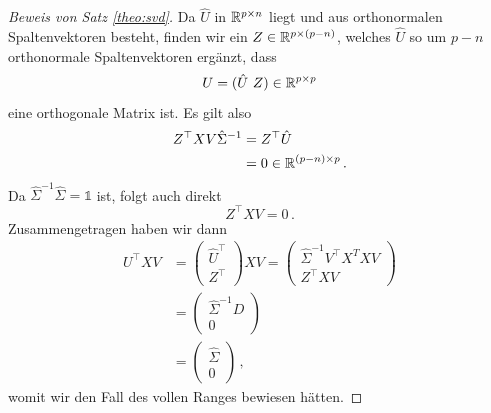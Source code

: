 \documentclass[../Bachelor_LennartKoliwer.tex]{subfiles}
\begin{document}
\begin{proof}[Beweis von Satz \ref{theo:svd}]
	Da $\hat{U}$ in $\mathbb{R}^{p\times n}$ liegt und aus orthonormalen Spaltenvektoren besteht, finden wir ein \(Z\in\mathbb{R}^{p\times (p-n)}\), welches $\hat{U}$ so um $p-n$ orthonormale Spaltenvektoren ergänzt, dass
	\[
		U = (\hat{U}\ Z)\in\mathbb{R}^{p\times p}
	\]
	eine orthogonale Matrix ist. Es gilt also
	\begin{align*}
		Z^\top XV\hat{\Sigma}^{-1} & =Z^\top\hat{U}               \\
		                           & =0 \in\mathbb{R}^{(p-n)\times p}\,.
	\end{align*}
	Da \(\hat{\Sigma}^{-1}\hat{\Sigma}=\mathbb{1}\) ist, folgt auch direkt
	\[
		Z^\top XV=0\,.
	\]
	Zusammengetragen haben wir dann
	\begin{align*}
		U^\top XV & = \begin{pmatrix}
			              \hat{U}^\top \\
			              Z^\top
		              \end{pmatrix} XV  = \begin{pmatrix}
			                                  \hat{\Sigma}^{-1}V^\top X^TXV \\
			                                  Z^\top XV
		                                  \end{pmatrix} \\
		          & = \begin{pmatrix}
			              \hat{\Sigma}^{-1}D \\
			              0
		              \end{pmatrix}                                \\
		          & = \begin{pmatrix}
			              \hat{\Sigma} \\
			              0
		              \end{pmatrix}\,,
	\end{align*}
	womit wir den Fall des vollen Ranges bewiesen hätten.
	

\end{proof}
\end{document}
